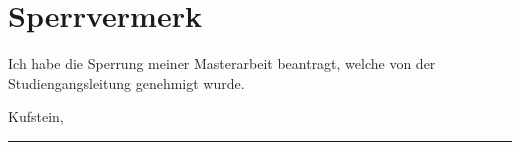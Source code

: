 \chapter*{Sperrvermerk}
\thispagestyle{empty}

Ich habe die Sperrung meiner Masterarbeit beantragt, welche von der Studiengangsleitung genehmigt wurde.

\vspace{2cm}
Kufstein, \mydate

\vspace{2cm}
\rule{10cm}{1pt}\\
\myname{}
